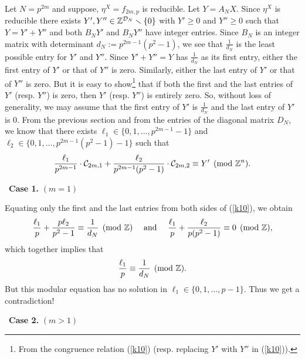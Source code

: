 \documentclass[a4paper,11pt]{amsart}
\begin{document}
Let $N=p^{2m}$ and suppose,  %
$\eta^X=f_{2m,p}$ is reducible. Let $Y=A_NX$. %
Since $\eta^X$ is reducible
there exists $Y',Y''\in\mathbb{Z}^{\mathcal{D}_N}\smallsetminus\{0\}$ with $Y'\geq0$ and $Y''\geq0$ such that $Y=Y'+Y''$ and both 
$B_NY'$ and $B_NY''$ have integer entries. Since $B_N$ is an integer matrix
with determinant $d_N:={p^{2m-1}(p^2-1)}$,  we see that $\frac1{d_N}$ is the least possible entry for 
$Y'$ and $Y''$. Since $Y'+Y''=Y$ has $\frac1{d_N}$ as its first entry, either the first entry of $Y'$ or that of
$Y''$ is zero. Similarly, either the last entry of $Y'$ or that of $Y''$ is zero. But it is easy to show\footnote{From the  %
congruence relation (\ref{k10})  \hspace{4pt}(resp. replacing $Y'$ with $Y''$ in (\ref{k10})).}
that if both the first and the last entries of $Y'$  (resp. $Y''$) is zero, then $Y'$ (resp. $Y''$) is entirely zero.
So, without loss of generality, we may assume that the first entry of $Y'$ is $\frac1{d_N}$ and the last entry of $Y'$ is 0.
From the previous section and from the entries of the diagonal matrix $D_N$, we know that there exists $\ell_1\in\{0,1,\hdots,p^{2m-1}-1\}$ and 
$\ell_2\in\{0,1,\hdots,p^{2m-1}(p^2-1)-1\}$ such that \begin{equation}
\frac{\ell_1}{p^{2m-1}}\cdot{\mathcal{C}_{2m,1}}+\frac{\ell_2}{p^{2m-1}(p^2-1)}\cdot{\mathcal{C}_{2m, 2}}\equiv Y'\pmod{\mathbb{Z}^n}.\label{k10}\end{equation}
                                                                                                                                                                                        

\ \newline\textbf{Case 1.} $(m=1)$


Equating only the first and the last entries from both sides of %
 (\ref{k10}), we obtain
$$\frac{\ell_1}{p}+\frac{p\ell_2}{p^2-1}\equiv\frac{1}{d_N}\pmod{\bb{Z}} \ \ \ \text{ and } \  \ \ \frac{\ell_1}{p}+\frac{\ell_2}{p(p^2-1)}\equiv0\pmod{\bb{Z}},$$
which together implies that $$\frac{\ell_1}{p}\equiv\frac{1}{d_N}\pmod{\mathbb{Z}}.$$
But this modular equation has no solution in $\ell_1\in\{0,1,\hdots,p-1\}$. Thus we get a contradiction!

\ \newline\textbf{Case 2.} $(m>1)$
\end{document}
